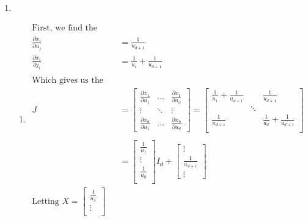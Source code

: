 \documentclass[paper=a4, fontsize=11pt]{scrartcl}
\begin{document}
\begin{enumerate}[1.]
  \item
    \begin{enumerate}[1]
      \item
        \begin{align*}
          \text{First, we find the partials: } \\
            \frac{\partial x_i}{\partial u_j} &= \frac{1}{u_{d+1}} \\
            \frac{\partial x_i}{\partial j_i} &= \frac{1}{u_i} + \frac{1}{u_{d+1}} \\
          \\ \text{Which gives us the Jacobian: }
          \\ J &=
            \begin{bmatrix}
              \frac{\partial x_1}{\partial u_1} & \ldots & \frac{\partial x_1}{\partial u_d} \\
              \vdots & \ddots & \vdots \\
              \frac{\partial x_d}{\partial u_1} & \ldots & \frac{\partial x_n}{\partial u_d}
            \end{bmatrix} =
            \begin{bmatrix}
              \frac{1}{u_1} + \frac{1}{u_{d+1}} & & \frac{1}{u_{d+1}} \\
              & \ddots & \\
              \frac{1}{u_{d+1}} & & \frac{1}{u_d} + \frac{1}{u_{d+1}} \\
            \end{bmatrix}
          \\ \\ &=
            \begin{bmatrix}
              \frac{1}{u_1} \\
              \vdots \\
              \frac{1}{u_d} \\
            \end{bmatrix}I_d +
            \begin{bmatrix}
              \vdots \\
              \frac{1}{u_{d+1}} \\
              \vdots
            \end{bmatrix}
          \\ \mbox{Letting } X =
            \begin{bmatrix}
              \frac{1}{u_1} \\
              \vdots \\

\end{bmatrix}
\end{align*}
\end{enumerate}
\end{enumerate}
\end{document}
